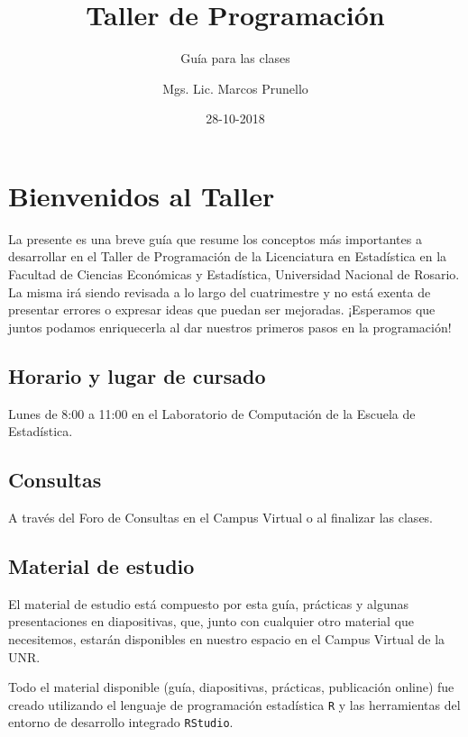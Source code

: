 \documentclass[]{book}
\title{Taller de Programación}
\subtitle{Guía para las clases}
\author{Mgs. Lic. Marcos Prunello}
\date{28-10-2018}
\begin{document}
\maketitle

{
\setcounter{tocdepth}{1}
\tableofcontents
}
\chapter{Bienvenidos al Taller}\label{bienvenidos-al-taller}

La presente es una breve guía que resume los conceptos más importantes a
desarrollar en el Taller de Programación de la Licenciatura en
Estadística en la Facultad de Ciencias Económicas y Estadística,
Universidad Nacional de Rosario. La misma irá siendo revisada a lo largo
del cuatrimestre y no está exenta de presentar errores o expresar ideas
que puedan ser mejoradas. ¡Esperamos que juntos podamos enriquecerla al
dar nuestros primeros pasos en la programación!

\section*{Horario y lugar de cursado}\label{horario-y-lugar-de-cursado}

Lunes de 8:00 a 11:00 en el Laboratorio de Computación de la Escuela de
Estadística.

\section*{Consultas}\label{consultas}

A través del Foro de Consultas en el Campus Virtual o al finalizar las
clases.

\section*{Material de estudio}\label{material-de-estudio}

El material de estudio está compuesto por esta guía, prácticas y algunas
presentaciones en diapositivas, que, junto con cualquier otro material
que necesitemos, estarán disponibles en nuestro espacio en el Campus
Virtual de la UNR.

Todo el material disponible (guía, diapositivas, prácticas, publicación
online) fue creado utilizando el lenguaje de programación estadística
\texttt{R} y las herramientas del entorno de desarrollo integrado
\texttt{RStudio}.
\end{document}
